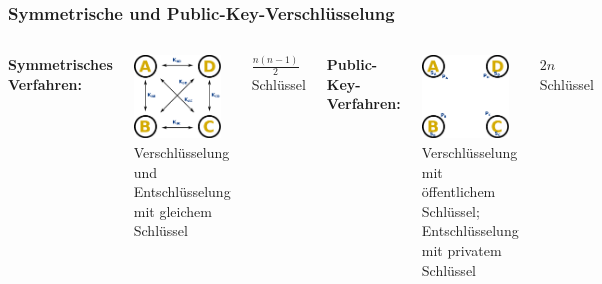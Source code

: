 \documentclass{beamer}
\begin{document}
\begin{frame}
\frametitle{Symmetrische und Public-Key-Verschlüsselung}
\begin{columns}

	\textbf{Symmetrisches Verfahren:}
	
	\includegraphics[width=0.9\textwidth]{images/symmetric.pdf}\\

	\small{Verschlüsselung und Entschlüsselung mit gleichem Schlüssel}

	\(\frac{n(n-1)}{2}\) Schlüssel

\pause
{}
	\textbf{Public-Key-Verfahren:}

	\includegraphics[width=0.9\textwidth]{images/asymmetric.pdf}\\

	\small{Verschlüsselung mit öffentlichem Schlüssel; Entschlüsselung mit privatem Schlüssel}

	\(2n\) Schlüssel

\end{columns}
\end{frame}
\end{document}
